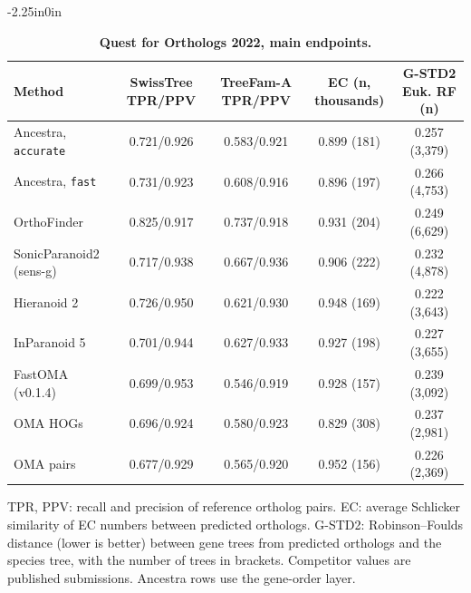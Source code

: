 \documentclass[10pt,letterpaper]{article}
\begin{document}
\begin{table}[!ht]
\begin{adjustwidth}{-2.25in}{0in}
\centering
\caption{{\bf Quest for Orthologs 2022, main endpoints.}}
\begin{tabular}{lcccc}
\hline
Method & SwissTree TPR/PPV & TreeFam-A TPR/PPV & EC (n, thousands) & G-STD2 Euk. RF (n)\\
\hline
Ancestra, \texttt{accurate} & 0.721/0.926 & 0.583/0.921 & 0.899 (181) & 0.257 (3,379)\\
Ancestra, \texttt{fast} & 0.731/0.923 & 0.608/0.916 & 0.896 (197) & 0.266 (4,753)\\
OrthoFinder & 0.825/0.917 & 0.737/0.918 & 0.931 (204) & 0.249 (6,629)\\
SonicParanoid2 (sens-g) & 0.717/0.938 & 0.667/0.936 & 0.906 (222) & 0.232 (4,878)\\
Hieranoid 2 & 0.726/0.950 & 0.621/0.930 & 0.948 (169) & 0.222 (3,643)\\
InParanoid 5 & 0.701/0.944 & 0.627/0.933 & 0.927 (198) & 0.227 (3,655)\\
FastOMA (v0.1.4) & 0.699/0.953 & 0.546/0.919 & 0.928 (157) & 0.239 (3,092)\\
OMA HOGs & 0.696/0.924 & 0.580/0.923 & 0.829 (308) & 0.237 (2,981)\\
OMA pairs & 0.677/0.929 & 0.565/0.920 & 0.952 (156) & 0.226 (2,369)\\
\hline
\end{tabular}
\begin{flushleft}TPR, PPV: recall and precision of reference ortholog pairs. EC: average Schlicker similarity of EC numbers between predicted orthologs. G-STD2: Robinson--Foulds distance (lower is better) between gene trees from predicted orthologs and the species tree, with the number of trees in brackets. Competitor values are published submissions. Ancestra rows use the gene-order layer.
\end{flushleft}
\label{tab:qfo}
\end{adjustwidth}
\end{table}
\end{document}
